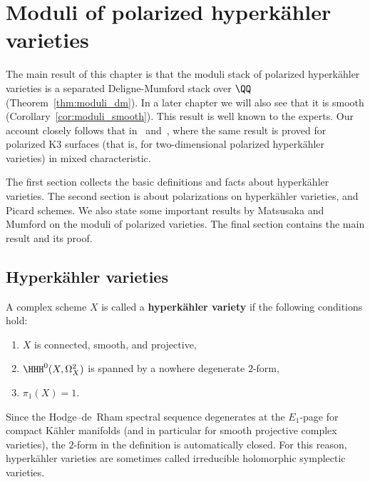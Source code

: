\chapter{Moduli of polarized hyperk\"ahler varieties}
The main result of this chapter is that the moduli stack of polarized hyperk\"ahler varieties is a separated Deligne-Mumford stack over $\QQ$ (Theorem~\ref{thm:moduli_dm}). In a later chapter we will also see that it is smooth (Corollary~\ref{cor:moduli_smooth}). This result is well known to the experts. Our account closely follows that in~\cite{RizovModuli} and~\cite[Chapter~5]{HuybrechtsK3}, where the same result is proved for polarized K3 surfaces (that is, for two-dimensional polarized hyperk\"ahler varieties) in mixed characteristic.

The first section collects the basic definitions and facts about hyperk\"ahler varieties. The second section is about polarizations on hyperk\"ahler varieties, and Picard schemes. We also state some important results by Matsusaka and Mumford on the moduli of polarized varieties. The final section contains the main result and its proof.

\section{Hyperk\"ahler varieties}
\begin{definition}\label{def:hk_mfold}
A complex scheme $X$ is called a {\bfseries hyperk\"ahler variety} if the following conditions hold:
\begin{enumerate}
\item $X$ is connected, smooth, and projective,
\item $\HHH^0(X,\Omega^2_X)$ is spanned by a nowhere degenerate $2$-form,
\item $\pi_1(X) = 1$.
\end{enumerate}
\end{definition}
\begin{remark}
Since the Hodge--de~Rham spectral sequence degenerates at the $E_1$-page for compact K\"ahler manifolds (and in particular for smooth projective complex varieties), the $2$-form in the definition is automatically closed. For this reason, hyperk\"ahler varieties are sometimes called irreducible holomorphic symplectic varieties.
\end{remark}

